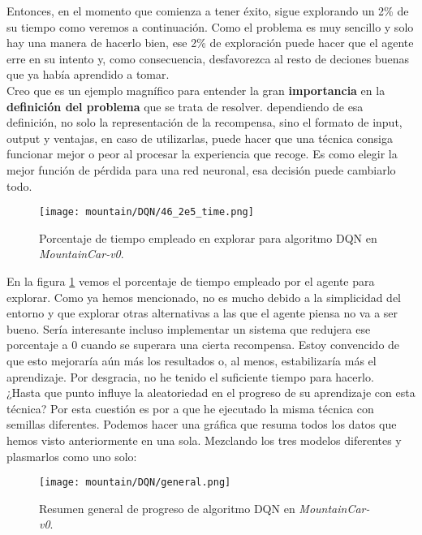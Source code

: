 \documentclass[11pt,fleqn]{book} %
\begin{document}
Entonces, en el momento que comienza a tener éxito, sigue explorando un 2\% de su tiempo como veremos a continuación. Como el problema es muy sencillo y solo hay una manera de hacerlo bien, ese 2\% de exploración puede hacer que el agente erre en su intento y, como consecuencia, desfavorezca al resto de deciones buenas que ya había aprendido a tomar. \\


Creo que es un ejemplo magnífico para entender la gran \textbf{importancia} en la \textbf{definición del problema} que se trata de resolver. dependiendo de esa definición, no solo la representación de la recompensa, sino el formato de input, output y ventajas, en caso de utilizarlas, puede hacer que una técnica consiga funcionar mejor o peor al procesar la experiencia que recoge. Es como elegir la mejor función de pérdida para una red neuronal, esa decisión puede cambiarlo todo.



\begin{figure}[H]
	\centering\texttt{[image: mountain/DQN/46\_2e5\_time.png]}
	\caption{Porcentaje de tiempo empleado en explorar para algoritmo DQN en \textit{MountainCar-v0}.}
	\label{fig:mountain10} %
\end{figure}

En la figura \ref{fig:mountain10} vemos el porcentaje de tiempo empleado por el agente para explorar. Como ya hemos mencionado, no es mucho debido a la simplicidad del entorno y que explorar otras alternativas a las que el agente piensa no va a ser bueno. Sería interesante incluso implementar un sistema que redujera ese porcentaje a 0 cuando se superara una cierta recompensa. Estoy convencido de que esto mejoraría aún más los resultados o, al menos, estabilizaría más el aprendizaje. Por desgracia, no he tenido el suficiente tiempo para hacerlo. \\

¿Hasta que punto influye la aleatoriedad en el progreso de su aprendizaje con esta técnica? Por esta cuestión es por a que he ejecutado la misma técnica con semillas diferentes. Podemos hacer una gráfica que resuma todos los datos que hemos visto anteriormente en una sola. Mezclando los tres modelos diferentes y plasmarlos como uno solo:

\begin{figure}[H]
	\centering\texttt{[image: mountain/DQN/general.png]}
	\caption{Resumen general de progreso de algoritmo DQN en \textit{MountainCar-v0}.}
	\label{fig:mountain11} %
\end{figure}
\end{document}
